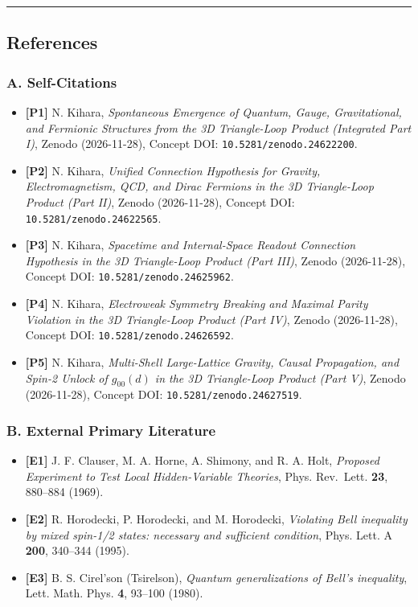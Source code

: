 \documentclass[
  a4paper,
]{article}
\providecommand{\tightlist}{%
  \setlength{\itemsep}{0pt}\setlength{\parskip}{0pt}}
\begin{document}
\begin{center}\rule{0.5\linewidth}{0.5pt}\end{center}

\subsection{References}\label{references}

\subsubsection{A. Self-Citations}\label{a.-self-citations}

\begin{itemize}
\tightlist
\item
  \textbf{{[}P1{]}} N. Kihara, \emph{Spontaneous Emergence of Quantum,
  Gauge, Gravitational, and Fermionic Structures from the 3D
  Triangle-Loop Product (Integrated Part I)}, Zenodo (2026-11-28),
  Concept DOI: \texttt{10.5281/zenodo.24622200}.
\item
  \textbf{{[}P2{]}} N. Kihara, \emph{Unified Connection Hypothesis for
  Gravity, Electromagnetism, QCD, and Dirac Fermions in the 3D
  Triangle-Loop Product (Part II)}, Zenodo (2026-11-28), Concept DOI:
  \texttt{10.5281/zenodo.24622565}.
\item
  \textbf{{[}P3{]}} N. Kihara, \emph{Spacetime and Internal-Space
  Readout Connection Hypothesis in the 3D Triangle-Loop Product (Part
  III)}, Zenodo (2026-11-28), Concept DOI:
  \texttt{10.5281/zenodo.24625962}.
\item
  \textbf{{[}P4{]}} N. Kihara, \emph{Electroweak Symmetry Breaking and
  Maximal Parity Violation in the 3D Triangle-Loop Product (Part IV)},
  Zenodo (2026-11-28), Concept DOI: \texttt{10.5281/zenodo.24626592}.
\item
  \textbf{{[}P5{]}} N. Kihara, \emph{Multi-Shell Large-Lattice Gravity,
  Causal Propagation, and Spin-2 Unlock of \(g_{00}(d)\) in the 3D
  Triangle-Loop Product (Part V)}, Zenodo (2026-11-28), Concept DOI:
  \texttt{10.5281/zenodo.24627519}.
\end{itemize}

\subsubsection{B. External Primary
Literature}\label{b.-external-primary-literature}

\begin{itemize}
\tightlist
\item
  \textbf{{[}E1{]}} J. F. Clauser, M. A. Horne, A. Shimony, and R. A.
  Holt, \emph{Proposed Experiment to Test Local Hidden-Variable
  Theories}, Phys. Rev.~Lett. \textbf{23}, 880--884 (1969).
\item
  \textbf{{[}E2{]}} R. Horodecki, P. Horodecki, and M. Horodecki,
  \emph{Violating Bell inequality by mixed spin-1/2 states: necessary
  and sufficient condition}, Phys. Lett. A \textbf{200}, 340--344
  (1995).
\item
  \textbf{{[}E3{]}} B. S. Cirel'son (Tsirelson), \emph{Quantum
  generalizations of Bell's inequality}, Lett. Math. Phys. \textbf{4},
  93--100 (1980).
\end{itemize}
\end{document}
